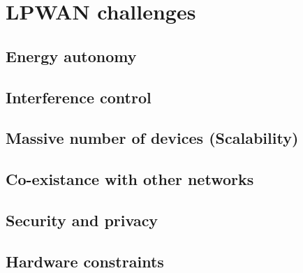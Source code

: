 \section{LPWAN challenges}


\subsection{Energy autonomy}
\subsection{Interference control}
\subsection{Massive number of devices (Scalability)}
\subsection{Co-existance with other networks}
\subsection{Security and privacy}
\subsection{Hardware constraints}
